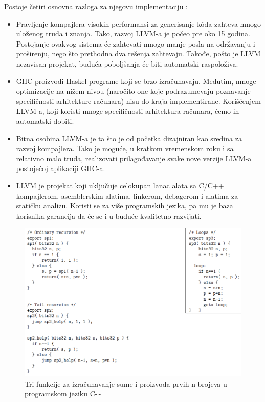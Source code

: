 \begin{enumerate}
	Postoje četiri osnovna razloga za njegovu implementaciju \cite{Ter10}:
	\begin{itemize}
		\item Pravljenje kompajlera visokih performansi za generisanje k\^{o}da zahteva mnogo uloženog truda i znanja. Tako, razvoj LLVM-a je počeo pre oko 15 godina. Postojanje ovakvog sistema će zahtevati mnogo manje posla na održavanju i proširenju, nego što prethodna dva rešenja zahtevaju. Takođe, pošto je LLVM nezavisan projekat, buduća poboljšanja će biti automatski raspoloživa. 
		\item GHC proizvodi Haskel programe koji se brzo izračunavaju. Međutim, mnoge optimizacije na nižem nivou (naročito one koje podrazumevaju poznavanje specifičnosti arhitekture računara) nisu do kraja implementirane. Korišćenjem LLVM-a, koji koristi mnoge specifičnosti arhitektura računara, ćemo ih automatski dobiti.
		\item Bitna osobina LLVM-a je ta što je od početka dizajniran kao sredina za razvoj kompajlera. Tako je moguće, u kratkom vremenskom roku i sa relativno malo truda, realizovati prilagođavanje svake nove verzije LLVM-a postojećoj aplikaciji GHC-a. 
		\item LLVM je projekat koji uključuje celokupan lanac alata sa C/C++ kompajlerom, asemblerskim alatima, linkerom, debagerom i alatima za statičku analizu. Koristi se za više programskih jezika, pa mu je baza korisnika garancija da će se i u buduće kvalitetno razvijati. 
	\end{itemize}
\end{enumerate}


\begin{figure}[h!]
	\begin{center}
		\includegraphics[scale=0.40]{resources/cmm.png}
	\end{center}
	\caption{Tri funkcije za izračunavanje sume i proizvoda prvih n brojeva u programskom jeziku C-\,-}
	\label{fig:cmm}
\end{figure}

